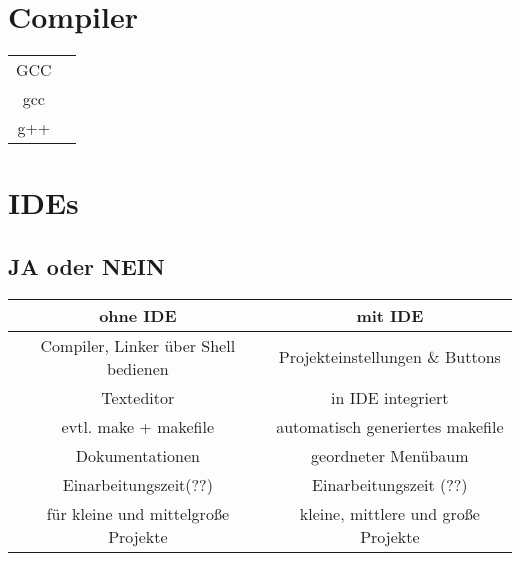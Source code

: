 \documentclass[a4paper]{report}
\theoremstyle{nonumberplain}
\begin{document}
\begin{center}
{
}
\end{center}


\section{Compiler}

\begin{tabular}{c|l}
	GCC & \\
	\; gcc & \\
	g++ & \\
\end{tabular}

\section{IDEs}
\subsection{JA oder NEIN}
\begin{center}
\begin{tabular}{|c||c|}
	\hline
	\textbf{ohne IDE} & \textbf{mit IDE} \\
	\hline \hline
	Compiler, Linker über Shell bedienen	&	Projekteinstellungen \& Buttons \\
	Texteditor				&		in IDE integriert\\
	evtl. make + makefile	&	automatisch generiertes makefile \\
	Dokumentationen & geordneter Menübaum \\
	\hline \hline
	Einarbeitungszeit(??) & Einarbeitungszeit (??) \\
	für kleine und mittelgroße Projekte & kleine, mittlere und große Projekte \\
	\hline
\end{tabular}
\end{center}
\end{document}
